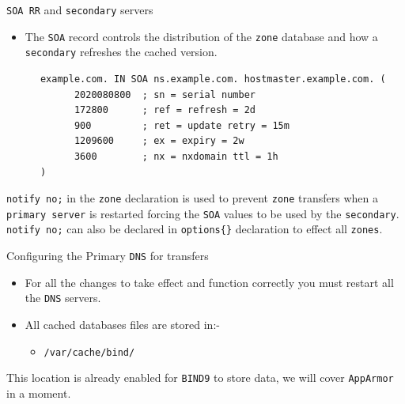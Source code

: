 \documentclass[xcolor=table]{beamer}
\begin{document}
\begin{frame}[fragile]{\texttt{SOA RR} and \texttt{secondary} servers}
  \begin{itemize}
    \item The \texttt{SOA} record controls the distribution of the \texttt{zone} database and how a \texttt{secondary} refreshes the cached version.
  \end{itemize}
  \begin{tcolorbox}
    \lstset{
      basicstyle=\tiny\ttfamily,
    }
    \begin{lstlisting}
      example.com. IN SOA ns.example.com. hostmaster.example.com. ( 
	        2020080800  ; sn = serial number 
	        172800      ; ref = refresh = 2d 
	        900         ; ret = update retry = 15m 
	        1209600     ; ex = expiry = 2w 
	        3600        ; nx = nxdomain ttl = 1h 
      ) 
    \end{lstlisting}
  \end{tcolorbox}
  \begin{tcolorbox}[title={\textbf{PERFORMANCE:}}]
    \scriptsize \texttt{notify no;} in the \texttt{zone} declaration is used to prevent \texttt{zone} transfers when a \texttt{primary server} is restarted forcing the \texttt{SOA} values to be used by the \texttt{secondary}.\\
    \scriptsize \texttt{notify no;} can also be declared in \texttt{options\{\}} declaration to effect all \texttt{zones}.    
  \end{tcolorbox}
\end{frame}

\begin{frame}{Configuring the Primary \texttt{DNS} for transfers}
  \begin{itemize}
    \item For all the changes to take effect and function correctly you must restart all the \texttt{DNS} servers.
    \item All cached databases files are stored in:-
      \begin{itemize}
        \item \texttt{/var/cache/bind/}
      \end{itemize}
  \end{itemize}
  \begin{tcolorbox}[title={\textbf{NOTE:}}]
    This location is already enabled for \texttt{BIND9} to store data, we will cover \texttt{AppArmor} in a moment.
  \end{tcolorbox}
\end{frame}
\end{document}
